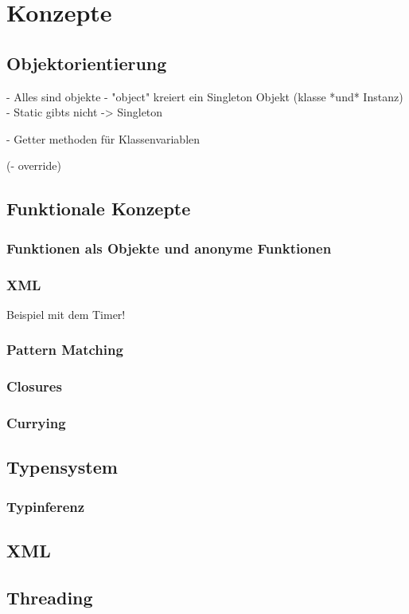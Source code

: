 \chapter{Konzepte}

\section{Objektorientierung}

- Alles sind objekte
- "object" kreiert ein Singleton Objekt (klasse *und* Instanz)
- Static gibts nicht -> Singleton

- Getter methoden für Klassenvariablen

(- override)


\section{Funktionale Konzepte}

\subsection{Funktionen als Objekte und anonyme Funktionen}

\subsection{XML}


Beispiel mit dem Timer!

\subsection{Pattern Matching}

\subsection{Closures}

\subsection{Currying}

\section{Typensystem}

\subsection{Typinferenz}

\section{XML}

\section{Threading}
